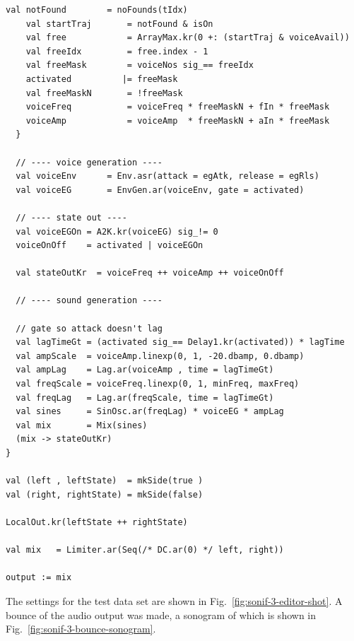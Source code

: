 \documentclass[11pt,a4paper]{article}
\newcommand{\figref}[1]{Fig.~\ref{#1}}
\begin{document}
\begin{lstlisting}[style=scala-small]
    val notFound        = noFounds(tIdx)
    val startTraj       = notFound & isOn
    val free            = ArrayMax.kr(0 +: (startTraj & voiceAvail))
    val freeIdx         = free.index - 1
    val freeMask        = voiceNos sig_== freeIdx
    activated          |= freeMask
    val freeMaskN       = !freeMask
    voiceFreq           = voiceFreq * freeMaskN + fIn * freeMask
    voiceAmp            = voiceAmp  * freeMaskN + aIn * freeMask
  }
  
  // ---- voice generation ----
  val voiceEnv      = Env.asr(attack = egAtk, release = egRls)
  val voiceEG       = EnvGen.ar(voiceEnv, gate = activated)
  
  // ---- state out ----
  val voiceEGOn = A2K.kr(voiceEG) sig_!= 0
  voiceOnOff    = activated | voiceEGOn
  
  val stateOutKr  = voiceFreq ++ voiceAmp ++ voiceOnOff
  
  // ---- sound generation ----
  
  // gate so attack doesn't lag
  val lagTimeGt = (activated sig_== Delay1.kr(activated)) * lagTime
  val ampScale  = voiceAmp.linexp(0, 1, -20.dbamp, 0.dbamp)
  val ampLag    = Lag.ar(voiceAmp , time = lagTimeGt)
  val freqScale = voiceFreq.linexp(0, 1, minFreq, maxFreq)
  val freqLag   = Lag.ar(freqScale, time = lagTimeGt)
  val sines     = SinOsc.ar(freqLag) * voiceEG * ampLag
  val mix       = Mix(sines)
  (mix -> stateOutKr)
}

val (left , leftState)  = mkSide(true )
val (right, rightState) = mkSide(false)

LocalOut.kr(leftState ++ rightState)

val mix   = Limiter.ar(Seq(/* DC.ar(0) */ left, right))

output := mix
\end{lstlisting}
%
The settings for the test data set are shown in \figref{fig:sonif-3-editor-shot}. A bounce of the audio output was made, a sonogram of which is shown in \figref{fig:sonif-3-bounce-sonogram}.
\end{document}
